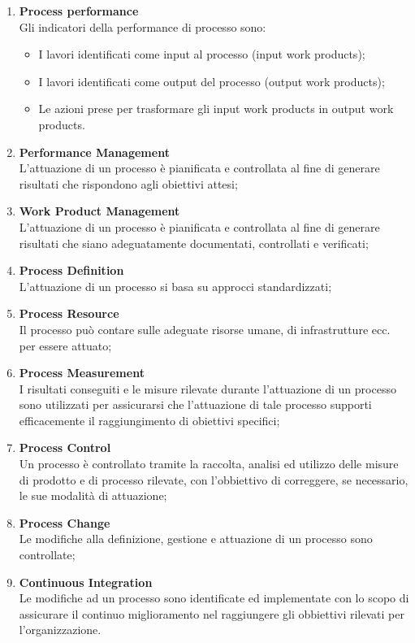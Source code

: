 \begin{enumerate}
\item \textbf{Process performance}\\
Gli indicatori della performance di processo sono:
\begin{itemize} 
\item I lavori identificati come input al processo (input work products);
\item I lavori identificati come output del processo (output work products);
\item Le azioni prese per trasformare gli input work products in output work products.
\end{itemize}

\item \textbf{Performance Management}\\
L’attuazione di un processo è pianificata e controllata al fine di generare risultati che rispondono agli obiettivi attesi;
\item \textbf{Work Product Management}\\
L’attuazione di un processo è pianificata e controllata al fine di generare risultati che siano adeguatamente documentati, controllati e verificati;
\item \textbf{Process Definition}\\
L’attuazione di un processo si basa su approcci standardizzati;
\item \textbf{Process Resource}\\
Il processo può contare sulle adeguate risorse umane, di infrastrutture ecc. per essere attuato;
\item \textbf{Process Measurement}\\
I risultati conseguiti e le misure rilevate durante l’attuazione di un processo sono utilizzati per assicurarsi che l’attuazione di tale processo supporti efficacemente il raggiungimento di obiettivi specifici;
\item \textbf{Process Control}\\
Un processo è controllato tramite la raccolta, analisi ed utilizzo delle misure di prodotto e di processo rilevate, con l’obbiettivo di correggere, se necessario, le sue modalità di attuazione;
\item \textbf{Process Change}\\
Le modifiche alla definizione, gestione e attuazione di un processo sono controllate;
\item \textbf{Continuous Integration}\\
Le modifiche ad un processo sono identificate ed implementate con lo scopo di assicurare il continuo miglioramento nel raggiungere gli obbiettivi rilevati per l’organizzazione.
\end{enumerate}	
